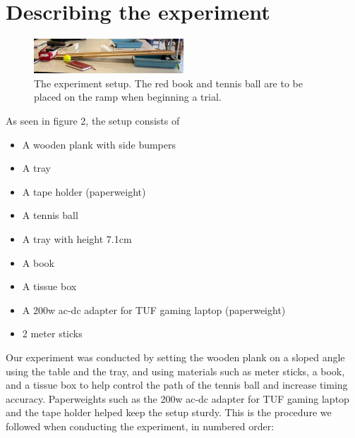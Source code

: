 \documentclass[12pt]{report}
\begin{document}
\section{Describing the experiment}
\begin{figure}
    \centering
    \includegraphics[width=0.5\textwidth]{setup.png}
    \caption{The experiment setup. The red book and tennis ball are to be placed on the ramp when beginning a trial.}
\end{figure}
As seen in figure 2, the setup consists of
\begin{itemize}
    \item A wooden plank with side bumpers
    \item A tray
    \item A tape holder (paperweight)
    \item A tennis ball
    \item A tray with height 7.1cm
    \item A book
    \item A tissue box
    \item A 200w ac-dc adapter for TUF gaming laptop (paperweight)
    \item 2 meter sticks
\end{itemize}
Our experiment was conducted by setting the wooden plank on a sloped angle using the table and the tray, and using materials such as meter sticks, a book, and a tissue box to help control the path of the tennis ball and increase timing accuracy. Paperweights such as the 200w ac-dc adapter for TUF gaming laptop and the tape holder helped keep the setup sturdy.
This is the procedure we followed when conducting the experiment, in numbered order:
\end{document}
